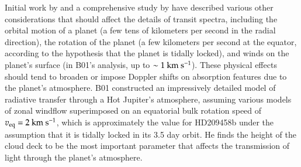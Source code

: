 Initial work by \citet{seager+sasselov2000} and a comprehensive study
by \citet[hereafter B01]{brown2001} have described various other
considerations that should affect the details of transit spectra,
including the orbital motion of a planet (a few tens of kilometers per
second in the radial direction), the rotation of the planet (a few
kilometers per second at the equator, according to the hypothesis that
the planet is tidally locked), and winds on the planet's surface (in
B01's analysis, up to $\sim 1 {\rm~km~s^{-1}}$).  These physical
effects should tend to broaden or impose Doppler shifts on absorption
features due to the planet's atmosphere.  B01 constructed an
impressively detailed model of radiative transfer through a Hot
Jupiter's atmosphere, assuming various models of zonal windflow
superimposed on an equatorial bulk rotation speed of $v_{\rm eq} = 2
{\rm~km~s^{-1}}$, which is approximately the value for HD209458b under
the assumption that it is tidally locked in its 3.5 day orbit.  He
finds the height of the cloud deck to be the most important parameter
that affects the transmission of light through the planet's
atmosphere.

